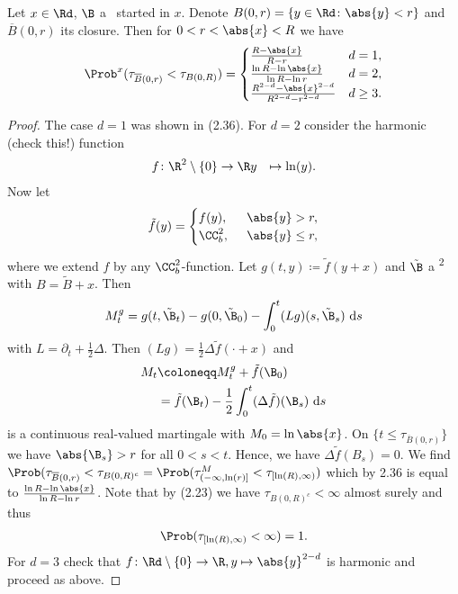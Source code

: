 \begin{thm}
	Let $x \in \Rd$, $\B$ a \BMd\ started in $x$.
	Denote $B(0,r)=\{y\in \Rd \colon \abs{y}<r\}$
	and $\overline{B}(0,r)$ its closure.
	Then for $0<r<\abs{x}<R$ we have
	\begin{align*}
		\Prob^x (\tau_{\overline{B}(0,r)}<\tau_{B(0,R)})=
		\begin{cases}
		\frac{R-\abs{x}}{R-r}~~&d=1,\\
		\frac{\ln R -\ln\abs{x}}{\ln R -\ln r}&d=2,\\
		\frac{R^{2-d}-\abs{x}^{2-d}}{R^{2-d}-r^{2-d}}&d\geq 3.
		\end{cases}
	\end{align*}
\end{thm}
\begin{proof}
	The case $d=1$ was shown in (2.36).
	For $d=2$ consider the harmonic (check this!) function
	\begin{align*}
		f \colon \R^2\setminus \{0\} &\to \R
		y &\mapsto \ln(y).
	\end{align*}
	Now let
	\begin{align*}
	\tilde{f}(y)=\begin{cases}
	f(y),~~&\abs{y}> r,\\
	\CC_b^2, &\abs{y}\leq r,
	\end{cases}
	\end{align*}
	where we extend $f$ by any $\CC_b^2$-function.
	Let $g(t,y)\coloneqq \tilde{f}(y+x)$ and $\tilde{\B}$ a
	\BM\textsuperscript{2} with $B=\tilde{B}+x$.
	Then
	\begin{align*}
	M_t^g=g(t,\tilde{\B}_t)-g(0,\tilde{\B}_0)-
	\int_0^t(Lg)(s,\tilde{\B}_s)~\mathrm{d}s
	\end{align*}
	with $L=\partial_t+\frac{1}{2}\Delta$.
	Then $(Lg)=\frac{1}{2}\Delta\tilde{f}(\cdot +x)$
	and
	\begin{align*}
		M_t &\coloneqq M_t^g+\tilde{f}(\B_0)\\
		&=\tilde{f}(\B_t)-\frac{1}{2}\int_0^t (\Delta \tilde{f})
		(\B_s)~\mathrm{d}s
	\end{align*}
	is a continuous real-valued martingale with $M_0=\ln\abs{x}$.
	On $\{t \leq \tau_{\overline{B}(0,r)}\}$ we have $\abs{\B_s}>r$
	for all $0<s<t$.
	Hence, we have $\Delta \tilde{f}(B_s)=0$.
	We find $\Prob(\tau_{\overline{B}(0,r)}<\tau_{B(0,R)^c}=
	\Prob(\tau^M_{(-\infty,\ln(r)]}<\tau_{[\ln(R),\infty)})$
	which by 2.36 is equal to $\frac{\ln R-\ln\abs{x}}{\ln R-\ln r}$.
	Note that by (2.23) we have $\tau_{B(0,R)^c}<\infty$ almost 
	surely and thus
	\begin{align*}
	\Prob(\tau_{[\ln(R),\infty)}<\infty)=1.
	\end{align*}
	For $d=3$ check that $f \colon \Rd\setminus \{0\}\to \R, y
	\mapsto  \abs{y}^{2-d}$ is harmonic and proceed as above.
\end{proof}

